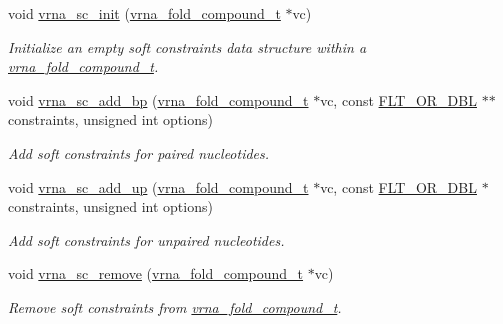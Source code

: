 \begin{DoxyCompactItemize}
\item 
void \hyperlink{group__soft__constraints_ga9d977a1681356778cc66dceafbe5b032}{vrna\-\_\-sc\-\_\-init} (\hyperlink{group__fold__compound_ga1b0cef17fd40466cef5968eaeeff6166}{vrna\-\_\-fold\-\_\-compound\-\_\-t} $\ast$vc)
\begin{DoxyCompactList}\small\item\em Initialize an empty soft constraints data structure within a \hyperlink{group__fold__compound_ga1b0cef17fd40466cef5968eaeeff6166}{vrna\-\_\-fold\-\_\-compound\-\_\-t}. \end{DoxyCompactList}\item 
void \hyperlink{group__soft__constraints_ga86049d4bb0ea8674cae9b6177156b184}{vrna\-\_\-sc\-\_\-add\-\_\-bp} (\hyperlink{group__fold__compound_ga1b0cef17fd40466cef5968eaeeff6166}{vrna\-\_\-fold\-\_\-compound\-\_\-t} $\ast$vc, const \hyperlink{group__data__structures_ga31125aeace516926bf7f251f759b6126}{F\-L\-T\-\_\-\-O\-R\-\_\-\-D\-B\-L} $\ast$$\ast$constraints, unsigned int options)
\begin{DoxyCompactList}\small\item\em Add soft constraints for paired nucleotides. \end{DoxyCompactList}\item 
void \hyperlink{group__soft__constraints_ga30f30c8eff9676775a3e831d972b5284}{vrna\-\_\-sc\-\_\-add\-\_\-up} (\hyperlink{group__fold__compound_ga1b0cef17fd40466cef5968eaeeff6166}{vrna\-\_\-fold\-\_\-compound\-\_\-t} $\ast$vc, const \hyperlink{group__data__structures_ga31125aeace516926bf7f251f759b6126}{F\-L\-T\-\_\-\-O\-R\-\_\-\-D\-B\-L} $\ast$constraints, unsigned int options)
\begin{DoxyCompactList}\small\item\em Add soft constraints for unpaired nucleotides. \end{DoxyCompactList}\item 
void \hyperlink{group__soft__constraints_ga73cdc07b9a199c614367bebef0f2c41a}{vrna\-\_\-sc\-\_\-remove} (\hyperlink{group__fold__compound_ga1b0cef17fd40466cef5968eaeeff6166}{vrna\-\_\-fold\-\_\-compound\-\_\-t} $\ast$vc)
\begin{DoxyCompactList}\small\item\em Remove soft constraints from \hyperlink{group__fold__compound_ga1b0cef17fd40466cef5968eaeeff6166}{vrna\-\_\-fold\-\_\-compound\-\_\-t}. \end{DoxyCompactList}\item 
$$
\end{DoxyCompactItemize}
